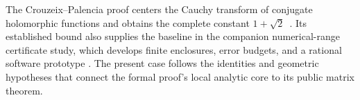 The Crouzeix--Palencia proof centers the Cauchy transform
of conjugate holomorphic functions and obtains the complete constant
$1+\sqrt2$~\citep{CrouzeixPalencia2017}. Its established bound also supplies
the baseline in the companion numerical-range certificate study, which
develops finite enclosures, error budgets, and a rational software
prototype \citep{GounderNumerical2026}. The present case follows the
identities and geometric hypotheses that connect the formal proof's
local analytic core to its public matrix theorem.
